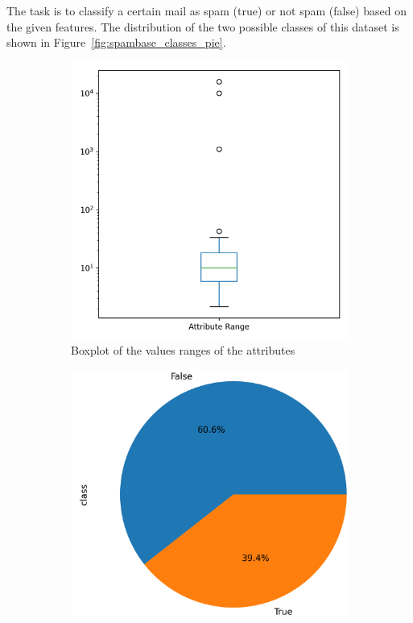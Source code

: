 \documentclass[a4paper,11pt]{article}
\begin{document}
    The task is to classify a certain mail as spam (true) or not spam (false) based on the given features. The distribution of the two possible classes of this dataset is shown in Figure~\ref{fig:spambase_classes_pie}. 
    
    \begin{figure}[h!]
        \centering
        \begin{subfigure}[c]{0.45\textwidth}
            \centering
            \includegraphics[width=1\textwidth]{figures/spambase_range_plot.png}
            \caption{Boxplot of the values ranges of the attributes}
            \label{fig:spambase_value_ranges}
        \end{subfigure}
        \begin{subfigure}[c]{0.45\textwidth}
            \centering
            \includegraphics[width=1.1\textwidth]{exercise_1/paper/figures/spambase_positive_pie.png}

\end{subfigure}
\end{figure}
\end{document}
